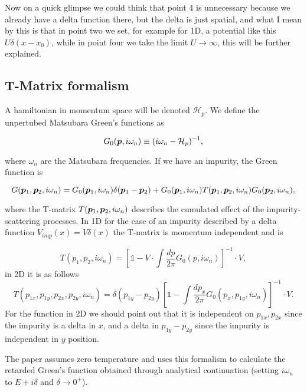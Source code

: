 Now on a quick glimpse we could think that point 4 is unnecessary because we already have a delta function there, but the delta is just spatial, and what I mean by this is that in point two we set, for example for 1D, a potential like this $U\delta(x-x_0)$, while in point four we take the limit $U\rightarrow \infty$, this will be further explained.

\subsection{T-Matrix formalism}

A hamiltonian in momentum space will be denoted $\mathcal{H}_p$. We define the unpertubed Matsubara Green's functions as

\begin{equation}
    G_0(\boldsymbol{p},i\omega_n) \equiv (i\omega_n-\mathcal{H}_p)^{-1},
\end{equation}

where $\omega_n$ are the Matsubara frequencies. If we have an impurity, the Green function is

\begin{equation}
    G(\boldsymbol{p}_1, \boldsymbol{p}_2, i\omega_n) = G_0(\boldsymbol{p}_1,i\omega_n)\delta(\boldsymbol{p}_1 - \boldsymbol{p}_2) + G_0(\boldsymbol{p}_1, i\omega_n)T(\boldsymbol{p}_1,\boldsymbol{p}_2,i\omega_n)G_0(\boldsymbol{p}_2,i\omega_n),
\end{equation}

where the T-matrix $T(\boldsymbol{p}_1,\boldsymbol{p}_2,i\omega_n)$ describes the cumulated effect of the impurity-scattering processes. In 1D for the case of an impurity described by a delta function $V_{imp}(x) = V\delta(x)$ the T-matrix is momentum independent and is

\begin{equation}
    T(p_1,p_2,i\omega_n) = [\mathbb{1} - V\cdot \int \frac{dp}{2\pi}G_0(p,i\omega_n)]^{-1}\cdot V,
\end{equation}
in 2D it is as follows
\begin{equation}
    T(p_{1x},p_{1y},p_{2x},p_{2y},i\omega_n) = \delta(p_{1y} - p_{2y})[\mathbb{1} - \int \frac{dp_x}{2\pi} G_0(p_x,p_{1y},i\omega_n)]^{-1}\cdot V.
    \label{kaladz03}
\end{equation}
For the function in 2D we should point out that it is independent on $p_{1x}, p_{2x}$ since the impurity is a delta in $x$, and a delta in $p_{1y} - p_{2y}$ since  the impurity is independent in $y$ position.

The paper assumes zero temperature and uses this formalism to calculate the retarded Green's function obtained through analytical continuation (setting $i\omega_n$ to $E + i\delta$ and $\delta \rightarrow 0^+$).

